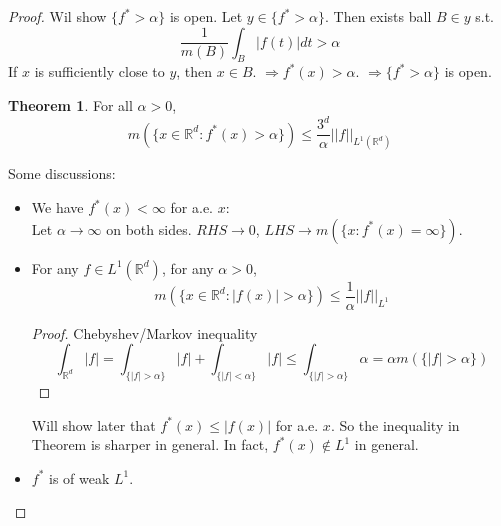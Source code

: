\documentclass{article}
\theoremstyle{definition}
\newtheorem{thm}{Theorem}
\begin{document}
  \begin{proof}
    Wil show $\{f^*>\alpha\}$ is open. Let $y \in \{f^* > \alpha \}$. Then exists ball $B \in y$ s.t. 
    $$\frac{1}{m(B)} \int _B |f(t)|dt > \alpha$$
    If $x$ is sufficiently close to $y$, then $x \in B$. $\Rightarrow f^*(x) > \alpha$. $\Rightarrow \{ f^* > \alpha \}$ is open. 
    \begin{thm}
      For all $\alpha > 0$, 
      $$m(\{x \in \mathbb{R}^d: f^*(x) > \alpha \} ) \leq \frac{3^d}{\alpha} ||f||_{L^1(\mathbb{R}^d)}$$

    \end{thm}
    Some discussions:\\
    \begin{itemize}
      \item We have $f^*(x) < \infty$ for a.e. $x$:\\
        Let $\alpha \to \infty$ on both sides. $RHS \to 0$, $LHS \to m(\{x: f^*(x) = \infty\})$.\\
      \item For any $f \in L^1(\mathbb{R}^d)$, for any $\alpha > 0$, 
    \begin{equation}
      m(\{x \in \mathbb{R}^d: |f(x)| > \alpha \}) \leq \frac{1}{\alpha} ||f||_{L^1}
    \end{equation}
    \begin{proof}
      Chebyshev/Markov inequality
      $$\int_{\mathbb{R}^d} |f| = \int_{\{|f|>\alpha\}} |f| + \int_{\{|f| < \alpha\}} |f| \leq \int_{\{|f| > \alpha\}} \alpha = \alpha m(\{|f|>\alpha\})$$
    \end{proof}
    Will show later that $f^*(x) \leq |f(x)|$ for a.e. $x$. So the inequality in Theorem is sharper in general. In fact, $f^*(x) \notin L^1$ in general.\\
  \item $f^*$ is of weak $L^1$. \\
    \end{itemize}
  \end{proof}
\end{document}
